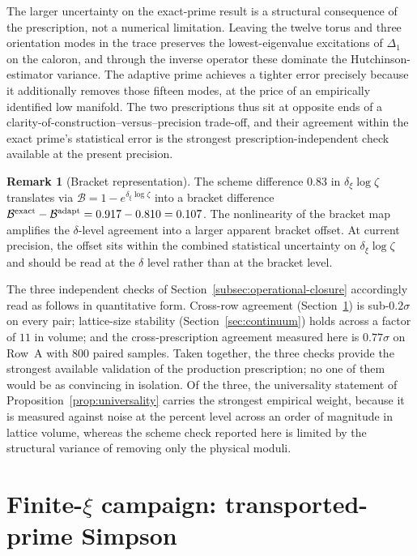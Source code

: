 \documentclass[a4paper,11pt]{article}
\theoremstyle{definition}
\newtheorem{remark}[theorem]{Remark}
\newcommand{\Bobs}{\mathcal{B}}
\begin{document}
The larger uncertainty on the exact-prime result is a structural
consequence of the prescription, not a numerical limitation.
Leaving the twelve torus and three orientation modes in the trace
preserves the lowest-eigenvalue excitations of $\Delta_1$ on the
caloron, and through the inverse operator these dominate the
Hutchinson-estimator variance. The adaptive prime achieves a
tighter error precisely because it additionally removes those
fifteen modes, at the price of an empirically identified low
manifold. The two prescriptions thus sit at opposite ends of a
clarity-of-construction--versus--precision trade-off, and their
agreement within the exact prime's statistical error is the
strongest prescription-independent check available at the present
precision.

\begin{remark}[Bracket representation]
\label{rem:bracket-nonlinearity}
The scheme difference $0.83$ in $\delta_\xi \log\zeta$ translates
via $\Bobs = 1 - e^{\delta_\xi \log\zeta}$ into a bracket
difference
$\Bobs^{\rm exact} - \Bobs^{\rm adapt} = 0.917 - 0.810 = 0.107$.
The nonlinearity of the bracket map amplifies the $\delta$-level
agreement into a larger apparent bracket offset. At current
precision, the offset sits within the combined statistical
uncertainty on $\delta_\xi \log\zeta$ and should be read at the
$\delta$ level rather than at the bracket level.
\end{remark}

The three independent checks of Section~\ref{subsec:operational-closure}
accordingly read as follows in quantitative form. Cross-row
agreement (Section~\ref{sec:finite-xi}) is sub-$0.2\sigma$ on every pair;
lattice-size stability (Section~\ref{sec:continuum}) holds across a
factor of $11$ in volume; and the cross-prescription agreement
measured here is $0.77\sigma$ on Row~A with $800$ paired samples.
Taken together, the three checks provide the strongest available
validation of the production prescription; no one of them would be
as convincing in isolation. Of the three, the universality
statement of Proposition~\ref{prop:universality} carries the
strongest empirical weight, because it is measured against noise
at the percent level across an order of magnitude in lattice
volume, whereas the scheme check reported here is limited by the
structural variance of removing only the physical moduli.


\section{Finite-$\xi$ campaign: transported-prime Simpson}
\label{sec:finite-xi}
\end{document}
